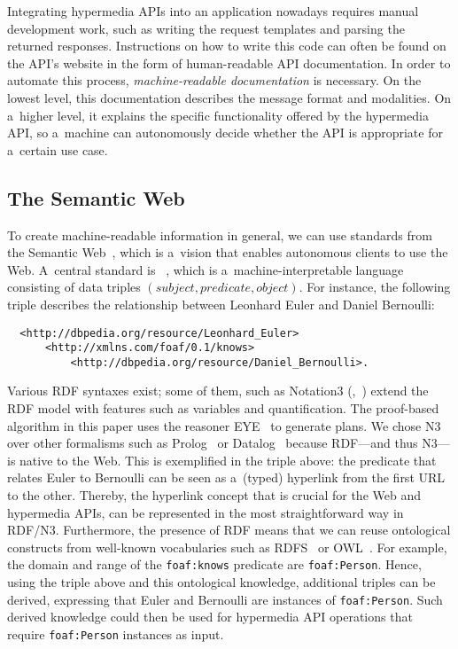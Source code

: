 Integrating hypermedia APIs into an application nowadays requires manual development work,
such as writing the \http request templates
and parsing the returned \http responses.
Instructions on how to write this code can often be found
on the API's website in the form of human-readable API documentation.
In order to automate this process, \emph{machine-readable documentation} is necessary.
On the lowest level, this documentation describes the message format and modalities.
On a~higher level, it explains the specific functionality offered by the hypermedia API,
so a~machine can autonomously decide whether the API is appropriate for a~certain use case.

\subsection{The Semantic Web}
To create machine-readable information in general,
we can use standards from the Semantic Web~\cite{SemanticWeb},
which is a~vision that enables autonomous clients to use the Web.
A~central standard is \rdf~\cite{RDF},
which is a~machine-interpretable language consisting of data triples
$(\textit{subject}, \textit{predicate}, \textit{object})$.
For instance, the following triple describes the relationship
between Leonhard Euler and Daniel Bernoulli:
\begin{Verbatim}
  <http://dbpedia.org/resource/Leonhard_Euler>
      <http://xmlns.com/foaf/0.1/knows>
          <http://dbpedia.org/resource/Daniel_Bernoulli>.
\end{Verbatim}
Various RDF syntaxes exist;
some of them, such as Notation3 (\nthree,~\cite{Notation3})
extend the RDF model with features such as variables and quantification.
The proof-based algorithm in this paper
uses the \nthree reasoner EYE~\cite{eyepaper} to generate plans.
We chose N3 over other formalisms such as Prolog~\cite{Prolog}
or Datalog~\cite{datalog}
because RDF---and thus N3---is native to the Web.
This is exemplified in the triple above:
the predicate that relates Euler to Bernoulli
can be seen as a~(typed) hyperlink from the first URL to the other.
Thereby, the hyperlink concept that is crucial for the Web and hypermedia APIs,
can be represented in the most straightforward way in RDF/N3.
Furthermore, the presence of RDF means that we can reuse ontological constructs
from well-known vocabularies such as RDFS~\cite{RDFS} or OWL~\cite{OWL}.
For example, the domain and range of the \verb!foaf:knows! predicate
are \verb!foaf:Person!.
Hence, using the triple above and this ontological knowledge,
additional triples can be derived,
expressing that Euler and Bernoulli are instances of \verb!foaf:Person!.
Such derived knowledge could then be used
for hypermedia API operations
that require \verb!foaf:Person! instances as input.



